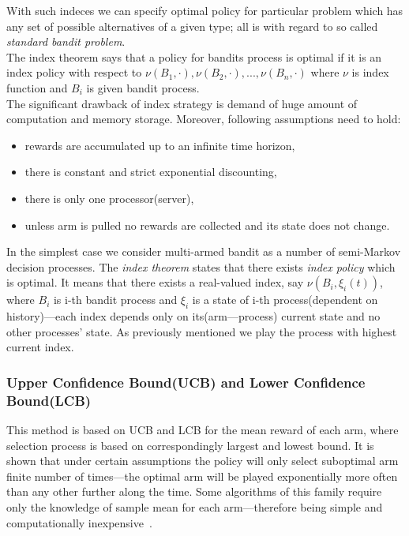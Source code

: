 \documentclass[12pt, a4paper, pdflatex, leqno]{report}
\begin{document}
With such indeces we can specify optimal policy for particular problem which has any set of possible alternatives of a given type; all is with regard to so called \emph{standard bandit problem}.\\

The index theorem says that a policy for bandits process is optimal if it is an index policy with respect to $\nu(B_1, \cdot), \nu(B_2, \cdot),..., \nu(B_n, \cdot)$ where $\nu$ is index function and $B_i$ is given bandit process.\\

The significant drawback of index strategy is demand of huge amount of computation and memory storage. Moreover, following assumptions need to hold:\\
\begin{itemize}
\item rewards are accumulated up to an infinite time horizon,
\item there is constant and strict exponential discounting,
\item there is only one processor(server),
\item unless arm is pulled no rewards are collected and its state does not change.\\
\end{itemize}

In the simplest case we consider multi-armed bandit as a number of semi-Markov decision processes. The \emph{index theorem} states that there exists \emph{index policy} which is optimal. It means that there exists a real-valued index, say $\nu ( B_i , \xi_i(t) )$, where $B_i$ is i-th bandit process and $\xi_i$ is a state of i-th process(dependent on history)---each index depends only on its(arm---process) current state and no other processes' state. As previously mentioned we play the process with highest current index.\\

\subsubsection{Upper Confidence Bound(UCB) and Lower Confidence Bound(LCB)}
This method is based on UCB and LCB for the mean reward of each arm, where selection process is based on correspondingly largest and lowest bound. It is shown that under certain assumptions the policy will only select suboptimal arm finite number of times---the optimal arm will be played exponentially more often than any other further along the time. Some algorithms of this family require only the knowledge of sample mean for each arm---therefore being simple and computationally inexpensive~\citep{Scott:2010:MBL:1944422.1944432}.\\
\end{document}
